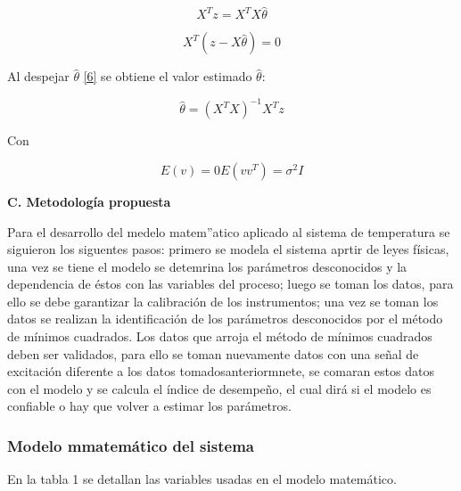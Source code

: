 \documentclass[letter,operight,12pt,spanish]{report}
\begin{document}
\begin{equation}
X^Tz=X^TX\hat{\theta}
\end{equation}

\begin{equation}
X^T(z-X\hat{\theta})=0
\end{equation}

Al despejar $\hat{\theta}$ \ref{6} se obtiene el valor estimado $\hat{\theta}$:

\begin{equation}
\hat{\theta}=(X^TX)^{-1}X^Tz
\end{equation}

Con

\begin{equation}
E(v)=0	E(vv^T)=\sigma^2I
\end{equation}

\textbf{C. Metodolog\'ia propuesta}

Para el desarrollo del medelo matem''atico aplicado al sistema de temperatura se siguieron los siguentes pasos: primero se modela el sistema aprtir de leyes f\'isicas, una vez se tiene el modelo se detemrina los par\'ametros desconocidos y la dependencia de \'estos con las variables del proceso; luego se toman los datos, para ello se debe garantizar la calibraci\'on de los instrumentos; una vez se toman los datos se realizan la identificaci\'on de los par\'ametros desconocidos por el m\'etodo de m\'inimos cuadrados. Los datos que arroja el m\'etodo de m\'inimos cuadrados deben ser validados, para ello se toman nuevamente datos con una se\~nal de excitaci\'on diferente a los datos tomadosanteriormnete, se comaran estos datos con el modelo y se calcula el \'indice de desempe\~no, el cual dir\'a si el modelo es confiable o hay que volver a estimar los par\'ametros.

\subsubsection*{Modelo mmatem\'atico del sistema}

En la tabla 1 se detallan las variables usadas en el modelo matem\'atico.\\
\end{document}
